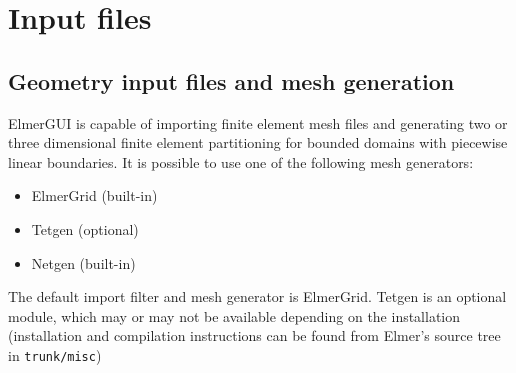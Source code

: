 




\chapter{Input files}

\section{Geometry input files and mesh generation}

ElmerGUI is capable of importing finite element mesh files and generating two or three
dimensional finite element partitioning for bounded domains with piecewise linear
boundaries. It is possible to use one of the following mesh generators:
\begin{itemize}
 \item ElmerGrid (built-in)
 \item Tetgen (optional)
 \item Netgen (built-in)
\end{itemize}
The default import filter and mesh generator is ElmerGrid. Tetgen is an optional
module, which may or may not be available depending on the installation (installation and
compilation instructions can be found from Elmer's source tree in {\tt trunk/misc})

